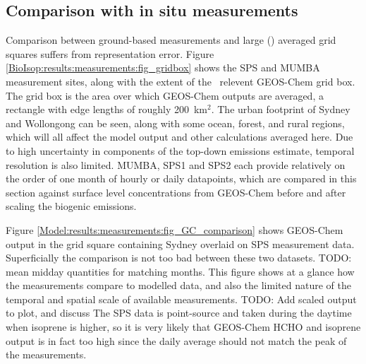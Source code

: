       
  \subsection{Comparison with in situ measurements}
    \label{BioIsop:results:measurements}
    
    Comparison between ground-based measurements and large (\lowhr) averaged grid squares suffers from representation error.
    Figure \ref{BioIsop:results:measurements:fig_gridbox} shows the SPS and MUMBA measurement sites, along with the extent of the \lowhr ~relevent GEOS-Chem grid box.
    The grid box is the area over which GEOS-Chem outputs are averaged, a rectangle with edge lengths of roughly 200~km$^{2}$.
    The urban footprint of Sydney and Wollongong can be seen, along with some ocean, forest, and rural regions, which will all affect the model output and other calculations averaged here.
    Due to high uncertainty in components of the top-down emissions estimate, temporal resolution is also limited.
    MUMBA, SPS1 and SPS2 each provide relatively on the order of one month of hourly or daily datapoints, which are compared in this section against surface level concentrations from GEOS-Chem before and after scaling the biogenic emissions.
    
    
    Figure \ref{Model:results:measurements:fig_GC_comparison} shows GEOS-Chem output in the grid square containing Sydney overlaid on SPS measurement data.
    Superficially the comparison is not too bad between these two datasets.
    TODO: mean midday quantities for matching months.
    This figure shows at a glance how the measurements compare to modelled data, and also the limited nature of the temporal and spatial scale of available measurements.
    TODO: Add scaled output to plot, and discuss
    The SPS data is point-source and taken during the daytime when isoprene is higher, so it is very likely that GEOS-Chem HCHO and isoprene output is in fact too high since the daily average should not match the peak of the measurements.
    
